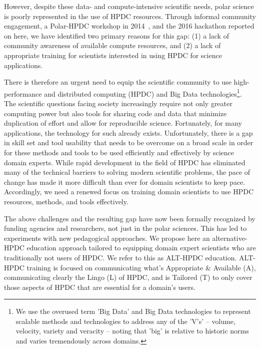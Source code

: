 \documentclass[conference]{IEEEtran}
\begin{document}
However, despite these data- and compute-intensive scientific needs, polar science is poorly represented in the use of HPDC resources. Through informal community engagement, a Polar-HPDC workshop in 2014~\cite{Workshop2014}, and the 2016 hackathon reported on here, we have identified two primary reasons for this gap: (1) a lack of community awareness of available compute resources, and (2) a lack of appropriate training for scientists interested in using HPDC for science applications. 

There is therefore an urgent need to equip the scientific community to use high-performance and distributed computing (HPDC) and Big Data technologies\footnote{ We use the overused term 'Big Data' and Big Data technologies to represent scalable methods and technologies to address any of the 'V's'  -- volume, velocity, variety and veracity -- noting that 'big' is relative to historic norms and varies tremendously across domains.}. The scientific questions facing society increasingly require not only greater computing power but also tools for sharing code and data that minimize duplication of effort and allow for reproducible science. Fortunately, for many applications, the technology for such already exists. Unfortunately, there is a gap in skill set and tool usability that needs to be overcome on a broad scale in order for these methods and tools to be used efficiently and effectively by science domain experts. While rapid development in the field of HPDC has eliminated many of the technical barriers to solving modern scientific problems, the pace of change has made it more difficult than ever for domain scientists to keep pace. Accordingly, we need a renewed focus on training domain scientists to use HPDC resources, methods, and tools effectively. 

The above challenges and the resulting gap have now been formally recognized by funding agencies and researchers, not just in the polar sciences. This has led to experiments with new pedagogical approaches. We propose here an alternative-HPDC education approach tailored to equipping domain expert scientists who are traditionally not users of HPDC.  We refer to this as ALT-HPDC education. ALT-HPDC training is focused on communicating what's Appropriate \& Available (A), communicating clearly the Lingo (L) of HPDC, and is Tailored (T) to only cover those aspects of HPDC that are essential for a domain's users. 
\end{document}
